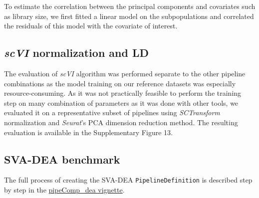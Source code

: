 \documentclass{bmcart}
\begin{document}
To estimate the correlation between the principal components and covariates such as library size, we first fitted a linear model on the subpopulations and correlated the residuals of this model with the covariate of interest.

\subsection*{\textit{scVI} normalization and LD}

The evaluation of \textit{scVI} algorithm was performed separate to the other pipeline combinations as the model training on our reference datasets was especially resource-consuming. As it was not practically feasible to perform the training step on many combination of parameters as it was done with other tools, we evaluated it on a representative subset of pipelines using \textit{SCTransform} normalization and \textit{Seurat}'s PCA dimension reduction method. The resulting evaluation is available in the Supplementary Figure 13. 

\subsection*{SVA-DEA benchmark}

The full process of creating the SVA-DEA \texttt{PipelineDefinition} is described step by step in the \href{https://github.com/plger/pipeComp/blob/master/vignettes/pipeComp_dea.Rmd}{pipeComp\_dea vignette}.
\end{document}
